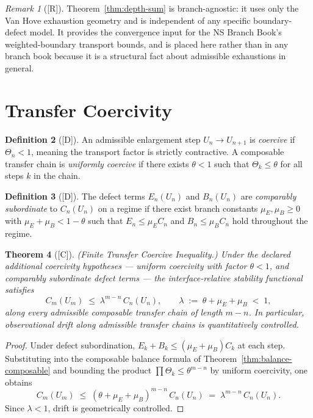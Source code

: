 \documentclass[12pt,oneside]{amsbook}
\theoremstyle{plain}
\newtheorem{theorem}{Theorem}[section]
\theoremstyle{definition}
\newtheorem{definition}[theorem]{Definition}
\theoremstyle{remark}
\newtheorem{remark}[theorem]{Remark}
\newcommand{\status}[1]{\textup{[#1]}}
\begin{document}
\begin{remark}[\status{R}]
Theorem~\ref{thm:depth-sum} is branch-agnostic: it uses only the
Van Hove exhaustion geometry and is independent of any specific
boundary-defect model.  It provides the convergence input for the
NS Branch Book's weighted-boundary transport bounds, and is placed
here rather than in any branch book because it is a structural fact
about admissible exhaustions in general.
\end{remark}

\section{Transfer Coercivity}

\begin{definition}[\status{D}]\label{def:coercive-regime}
An admissible enlargement step $U_n \to U_{n+1}$ is
\emph{coercive} if $\Theta_n < 1$, meaning the transport factor is
strictly contractive.  A composable transfer chain is
\emph{uniformly coercive} if there exists $\theta < 1$ such that
$\Theta_k \leq \theta$ for all steps $k$ in the chain.
\end{definition}

\begin{definition}[\status{D}]\label{def:defect-subordinate}
The defect terms $E_n(U_n)$ and $B_n(U_n)$ are
\emph{comparably subordinate} to $C_n(U_n)$ on a regime if there
exist branch constants $\mu_E, \mu_B \geq 0$ with
$\mu_E + \mu_B < 1 - \theta$ such that
$E_n \leq \mu_E C_n$ and $B_n \leq \mu_B C_n$ hold throughout the
regime.
\end{definition}

\begin{theorem}[\status{C}]\label{thm:coercive-inequality}
\textup{(Finite Transfer Coercive Inequality.)}  Under the declared
additional coercivity hypotheses --- uniform coercivity with factor
$\theta < 1$, and comparably subordinate defect terms --- the
interface-relative stability functional satisfies
\[
  C_m(U_m) \;\leq\; \lambda^{m-n}\, C_n(U_n),
  \qquad
  \lambda \;:=\; \theta + \mu_E + \mu_B \;<\; 1,
\]
along every admissible composable transfer chain of length $m - n$.
In particular, observational drift along admissible transfer chains is
quantitatively controlled.
\end{theorem}

\begin{proof}
Under defect subordination, $E_k + B_k \leq (\mu_E + \mu_B) C_k$ at
each step.  Substituting into the composable balance formula of
Theorem~\ref{thm:balance-composable} and bounding the product
$\prod \Theta_k \leq \theta^{m-n}$ by uniform coercivity, one obtains
\[
  C_m(U_m)
  \;\leq\;
  (\theta + \mu_E + \mu_B)^{m-n}\, C_n(U_n)
  \;=\;
  \lambda^{m-n}\, C_n(U_n).
\]
Since $\lambda < 1$, drift is geometrically controlled.
\end{proof}
\end{document}
